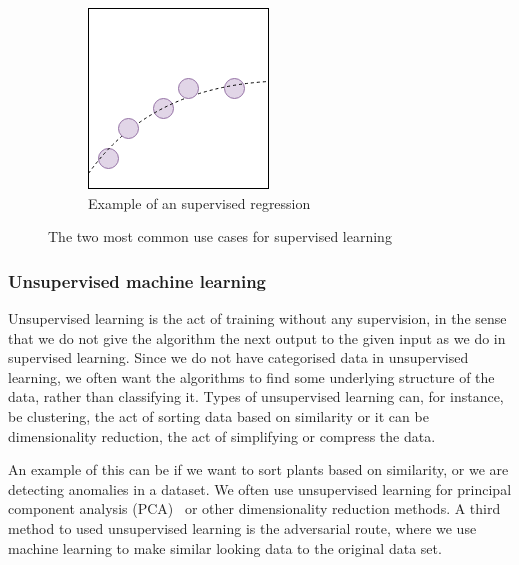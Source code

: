 \begin{figure}
\begin{subfigure}[b]{0.34\textwidth}
         \includegraphics[width=\textwidth]{background/figures/supervised_regression.png}
         \caption{Example of an supervised regression}
         \label{fig:supervised_regression}
     \end{subfigure}
        \caption{The two most common use cases for supervised learning}
        \label{fig:supervised_learning}
\end{figure}


\subsubsection{Unsupervised machine learning}
Unsupervised learning is the act of training without any supervision, in the sense that we do not give the algorithm the next output to the given input as we do in supervised learning. 
Since we do not have categorised data in unsupervised learning, we often want the algorithms to find some underlying structure of the data, rather than classifying it.
Types of unsupervised learning can, for instance, be clustering, the act of sorting data based on similarity or it can be dimensionality reduction, the act of simplifying or compress the data.

An example of this can be if we want to sort plants based on similarity, or we are detecting anomalies in a dataset. We often use unsupervised learning for principal component analysis (PCA)~\cite{doi:10.1080/14786440109462720} or other dimensionality reduction methods.
A third method to used unsupervised learning is the adversarial route, where we use machine learning to make similar looking data to the original data set. 
        
